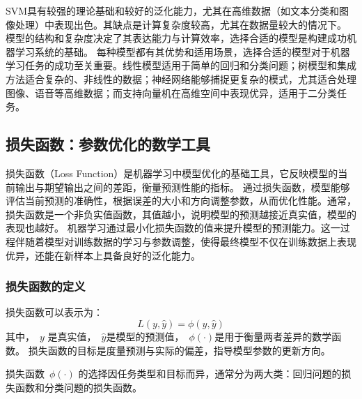 SVM具有较强的理论基础和较好的泛化能力，尤其在高维数据（如文本分类和图像处理）中表现出色。其缺点是计算复杂度较高，尤其在数据量较大的情况下。
模型的结构和复杂度决定了其表达能力与计算效率，选择合适的模型是构建成功机器学习系统的基础。
每种模型都有其优势和适用场景，选择合适的模型对于机器学习任务的成功至关重要。线性模型适用于简单的回归和分类问题；树模型和集成方法适合复杂的、非线性的数据；神经网络能够捕捉更复杂的模式，尤其适合处理图像、语音等高维数据；而支持向量机在高维空间中表现优异，适用于二分类任务。


\subsection{损失函数：参数优化的数学工具}

损失函数（Loss Function）是机器学习中模型优化的基础工具，它反映模型的当前输出与期望输出之间的差距，衡量预测性能的指标。
通过损失函数，模型能够评估当前预测的准确性，根据误差的大小和方向调整参数，从而优化性能。通常，损失函数是一个非负实值函数，其值越小，说明模型的预测越接近真实值，模型的表现也越好。
机器学习通过最小化损失函数的值来提升模型的预测能力。这一过程伴随着模型对训练数据的学习与参数调整，使得最终模型不仅在训练数据上表现优异，还能在新样本上具备良好的泛化能力。
\subsubsection{损失函数的定义}

损失函数可以表示为：
$$ L(y, \hat{y}) = \phi(y, \hat{y})$$
其中，~$y$ 是真实值，~$\hat{y}$是模型的预测值，~$\phi(\cdot)$是用于衡量两者差异的数学函数。 损失函数的目标是度量预测与实际的偏差，指导模型参数的更新方向。

损失函数~$\phi(\cdot)$ 的选择因任务类型和目标而异，通常分为两大类：回归问题的损失函数和分类问题的损失函数。
%

